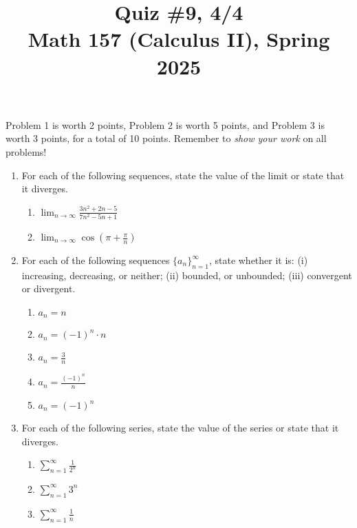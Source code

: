 \documentclass[11pt]{article}
\title{Quiz \#9, 4/4\\ Math 157 (Calculus II), Spring 2025}
\date{}
\begin{document}
\maketitle

\thispagestyle{empty}

\vspace{-2cm}

Problem 1 is worth 2 points, Problem 2 is worth 5 points, and Problem 3 is worth 3 points, for a total of 10 points. Remember to \emph{show your work} on all problems!

\begin{enumerate}

\item For each of the following sequences, state the value of the limit or state that it diverges.

\begin{enumerate}
\item $\displaystyle \lim_{n\to \infty} \frac{3n^2+2n-5}{7n^2-5n+1}$ \\[5pt]
\item $\displaystyle \lim_{n\to \infty} \cos\left(\pi+\frac{\pi}{n}\right)$
\end{enumerate}

\vspace{0.75in}

\item For each of the following sequences $\{a_n\}_{n=1}^{\infty}$, state whether it is: (i) increasing, decreasing, or neither; (ii) bounded, or unbounded; (iii) convergent or divergent.

\begin{enumerate}
\item $a_n = n$ \\[2pt]
\item $a_n = (-1)^n \cdot n$ \\[2pt]
\item $a_n = \displaystyle \frac{3}{n}$ \\[2pt]
\item $a_n = \displaystyle \frac{(-1)^n}{n}$ \\[2pt]
\item $a_n = (-1)^n$
\end{enumerate}

\vspace{0.75in}

\item For each of the following series, state the value of the series or state that it diverges.

\begin{enumerate}
\item $\displaystyle \sum_{n=1}^{\infty} \frac{1}{2^n}$ \\[2pt]
\item $\displaystyle \sum_{n=1}^{\infty} 3^n$ \\[2pt]
\item $\displaystyle \sum_{n=1}^{\infty} \frac{1}{n}$
\end{enumerate}

\end{enumerate}
\end{document}
